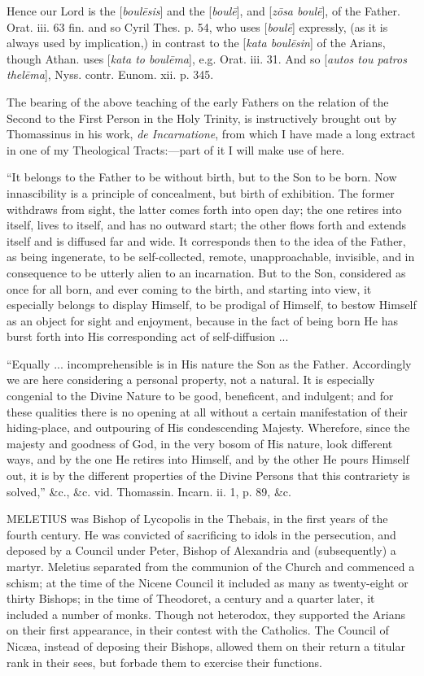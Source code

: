 Hence
our Lord is the [\emph{boul\={e}sis}] and the [\emph{boul\={e}}],
and [\emph{z\={o}sa boul\={e}}], of the Father. Orat. iii. 63
fin. and so Cyril Thes. p. 54, who uses [\emph{boul\={e}}]
expressly, (as it is always used by implication,) in contrast to the [\emph{kata
boul\={e}sin}] of the Arians, though Athan. uses [\emph{kata to
boul\={e}ma}], e.g. Orat. iii. 31. And so [\emph{autos tou patros
thel\={e}ma}], Nyss. contr. Eunom. xii. p. 345.

The
bearing of the above teaching of the early Fathers on the relation of
the Second to the First Person in the Holy Trinity, is instructively
brought out by Thomassinus in his work, \emph{de Incarnatione}, from
which I have made a long extract in one of my Theological
Tracts:—part of it I will make use of here.

``It
belongs to the Father to be without birth, but to the Son to be born.
Now innascibility is a principle of concealment, but birth of
exhibition. The former withdraws from sight, the latter comes forth
into open day; the one retires into itself, lives to itself, and has
no outward start; the other flows forth and extends itself and is
diffused far and wide. It corresponds then to the idea of the Father,
as being ingenerate, to be self-collected, remote, unapproachable,
invisible, and in consequence to be utterly alien to an incarnation.
But to the Son, considered as once for all born, and ever coming to
the birth, and starting into view, it especially belongs to display
Himself, to be prodigal of Himself, to bestow Himself as an
object for sight and enjoyment, because in the fact of being born He
has burst forth into His corresponding act of self-diffusion ...

``Equally
... incomprehensible is in His nature the Son as the Father.
Accordingly we are here considering a personal property, not a
natural. It is especially congenial to the Divine Nature to be good,
beneficent, and indulgent; and for these qualities there is no opening
at all without a certain manifestation of their hiding-place, and
outpouring of His condescending Majesty. Wherefore, since the majesty
and goodness of God, in the very bosom of His nature, look different
ways, and by the one He retires into Himself, and by the other He
pours Himself out, it is by the different properties of the Divine
Persons that this contrariety is solved,'' \&c., \&c. vid.
Thomassin. Incarn. ii. 1, p. 89, \&c.


MELETIUS
was Bishop of Lycopolis in the Thebais, in the first years of the
fourth century. He was convicted of sacrificing to idols in the
persecution, and deposed by a Council under Peter, Bishop of
Alexandria and (subsequently) a martyr. Meletius separated from the
communion of the Church and commenced a schism; at the time of the
Nicene Council it included as many as twenty-eight or thirty Bishops;
in the time of Theodoret, a century and a quarter later, it included a
number of monks. Though not heterodox, they supported the Arians on
their first appearance, in their contest with the Catholics. The
Council of Nicæa, instead of deposing their Bishops, allowed them on
their return a titular rank in their sees, but forbade them to
exercise their functions.

